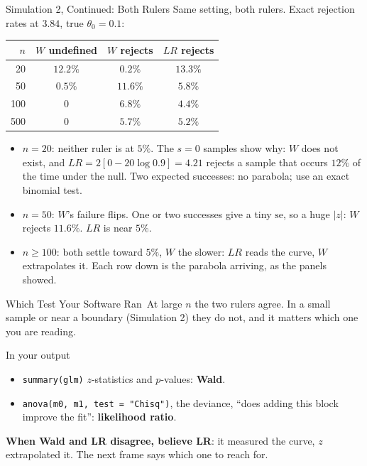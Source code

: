\documentclass[aspectratio=169,11pt,xcolor=dvipsnames]{beamer}
\newcommand{\SE}{\mathrm{se}}
\newcommand{\core}{\,\raisebox{0.6pt}{\textcolor{corestar}{$\bigstar$}}}
\begin{document}
\begin{frame}{Simulation 2, Continued: Both Rulers}
Same setting, both rulers. Exact rejection rates at $3.84$, true
$\theta_0 = 0.1$:
\vskip-2pt
\begin{center}
\renewcommand{\arraystretch}{1.0}
\begin{tabular}{rccc}
\toprule
$n$ & $W$ undefined & $W$ rejects & $LR$ rejects \\
\midrule
20   & $12.2\%$ & $0.2\%$  & $13.3\%$ \\
50   & $0.5\%$  & $11.6\%$ & $5.8\%$  \\
100  & $0$      & $6.8\%$  & $4.4\%$  \\
500  & $0$      & $5.7\%$  & $5.2\%$  \\
\bottomrule
\end{tabular}
\end{center}
\vskip1pt
\begin{itemize}\itemsep2pt
  \item $n = 20$: neither ruler is at $5\%$. The $s = 0$ samples show why:
        $W$ does not exist, and $LR = 2[0 - 20\log 0.9] = 4.21$ rejects a
        sample that occurs $12\%$ of the time under the null. Two expected
        successes: no parabola; use an exact binomial test.
  \item $n = 50$: $W$'s failure flips. One or two successes give a tiny
        $\SE$, so a huge $|z|$: $W$ rejects $11.6\%$. $LR$ is near $5\%$.
  \item $n \ge 100$: both settle toward $5\%$, $W$ the slower: $LR$
        reads the curve, $W$ extrapolates it. Each row down is the
        parabola arriving, as the panels showed.
\end{itemize}
\end{frame}

\begin{frame}{Which Test Your Software Ran\core}
At large $n$ the two rulers agree. In a small sample or near a boundary
(Simulation 2) they do not, and it matters which one you are reading.
\vskip6pt
\begin{block}{In your output}
\begin{itemize}\itemsep4pt
  \item \texttt{summary(glm)} $z$-statistics and $p$-values: \textbf{Wald}.
  \item \texttt{anova(m0, m1, test = "Chisq")}, the deviance, ``does
        adding this block improve the fit'': \textbf{likelihood ratio}.
\end{itemize}
\end{block}
\vskip6pt
\textbf{When Wald and LR disagree, believe LR}: it measured the curve,
$z$ extrapolated it. The next frame says which one to reach for.
\end{frame}
\end{document}
